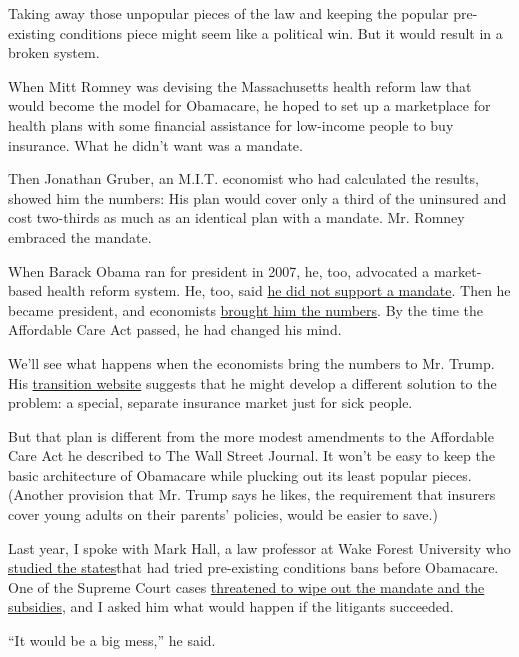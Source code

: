 Taking away those unpopular pieces of the law and keeping the popular
pre-existing conditions piece might seem like a political win. But it
would result in a broken system.

When Mitt Romney was devising the Massachusetts health reform law that
would become the model for Obamacare, he hoped to set up a marketplace
for health plans with some financial assistance for low-income people to
buy insurance. What he didn't want was a mandate.

Then Jonathan Gruber, an M.I.T. economist who had calculated the
results, showed him the numbers: His plan would cover only a third of
the uninsured and cost two-thirds as much as an identical plan with a
mandate. Mr. Romney embraced the mandate.

When Barack Obama ran for president in 2007, he, too, advocated a
market-based health reform system. He, too, said
\href{http://www.nytimes.com/2007/11/16/us/politics/16facts.html}{he did
not support a mandate}. Then he became president, and economists
\href{http://www.newyorker.com/news/news-desk/the-mandate-memo-how-obama-changed-his-mind}{brought
him the numbers}. By the time the Affordable Care Act passed, he had
changed his mind.

We'll see what happens when the economists bring the numbers to Mr.
Trump. His
\href{https://www.greatagain.gov/policy/healthcare.html}{transition
website} suggests that he might develop a different solution to the
problem: a special, separate insurance market just for sick people.

But that plan is different from the more modest amendments to the
Affordable Care Act he described to The Wall Street Journal. It won't be
easy to keep the basic architecture of Obamacare while plucking out its
least popular pieces. (Another provision that Mr. Trump says he likes,
the requirement that insurers cover young adults on their parents'
policies, would be easier to save.)

Last year, I spoke with Mark Hall, a law professor at Wake Forest
University who
\href{http://law.wfu.edu/faculty/assets/profile/cv/cv.hallma.pdf\#page=10}{studied
the states}that had tried pre-existing conditions bans before Obamacare.
One of the Supreme Court cases
\href{http://www.nytimes.com/2015/03/02/upshot/how-an-adverse-supreme-court-ruling-would-send-obamacare-into-a-tailspin.html}{threatened
to wipe out the mandate and the subsidies}, and I asked him what would
happen if the litigants succeeded.

``It would be a big mess,'' he said.

